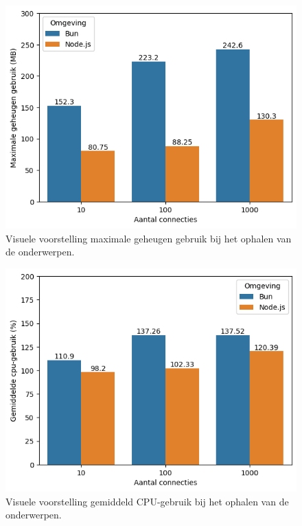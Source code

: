   \begin{figure}[H]
    \centering
    \includegraphics{graphics/GetMySqlRAM.png}
    \caption{\label{fig:getgeheugennmysql}Visuele voorstelling maximale geheugen gebruik bij het ophalen van de onderwerpen.}
  \end{figure}
  \begin{figure}[H]
    \centering
    \includegraphics{graphics/GetMySqlCpu.png}
    \caption{\label{fig:getcpymysql}Visuele voorstelling gemiddeld CPU-gebruik bij het ophalen van de onderwerpen.}
  \end{figure}

